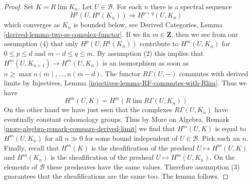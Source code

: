 \begin{proof}
Set $K = R\lim K_n$. Let $U \in \mathcal{B}$. For each $n$ there is a spectral
sequence
$$
H^p(U, H^q(K_n)) \Rightarrow H^{p + q}(U, K_n)
$$
which converges as $K_n$ is bounded below, see
Derived Categories, Lemma \ref{derived-lemma-two-ss-complex-functor}.
If we fix $m \in \mathbf{Z}$, then we see from our assumption (4)
that only $H^p(U, H^q(K_n))$ contribute to $H^m(U, K_n)$
for $0 \leq p \leq d$ and $m - d \leq q \leq m$. By assumption (2)
this implies that $H^m(U, K_{n + 1}) \to H^m(U, K_n)$ is an isomorphism
as soon as $n \geq \max{n(m), \ldots, n(m - d)}$. The functor $R\Gamma(U, -)$
commutes with derived limits by
Injectives, Lemma \ref{injectives-lemma-RF-commutes-with-Rlim}.
Thus we have
$$
H^m(U, K) = H^m(R\lim R\Gamma(U, K_n))
$$
On the other hand we have just seen that the complexes $R\Gamma(U, K_n)$
have eventually constant cohomology groups. Thus by
More on Algebra, Remark \ref{more-algebra-remark-compare-derived-limit}
we find that $H^m(U, K)$ is equal to $H^m(U, K_n)$ for
all $n \gg 0$ for some bound independent of $U \in \mathcal{B}$.
Pick such an $n$. Finally, recall that $H^m(K)$ is the sheafification of
the presheaf $U \mapsto H^m(U, K)$ and $H^m(K_n)$ is the sheafification
of the presheaf $U \mapsto H^m(U, K_n)$. On the elements
of $\mathcal{B}$ these presheaves have the same values. Therefore assumption
(3) guarantees that the sheafifications are the same too.
The lemma follows.
\end{proof}

